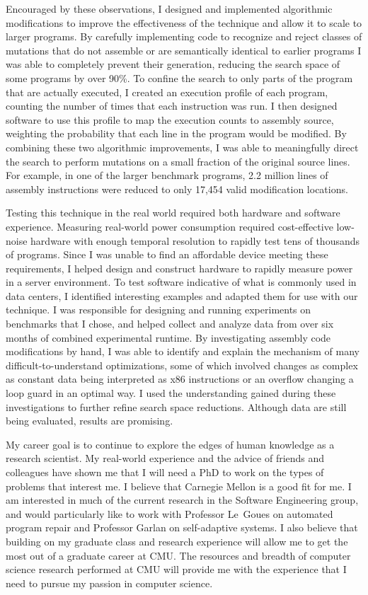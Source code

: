 \documentclass[12pt]{article}
\begin{document}
Encouraged by these observations, I designed and implemented algorithmic
modifications to improve the effectiveness of the technique and allow it to
scale to larger programs. By carefully implementing code to recognize and reject
classes of mutations that do not assemble or are semantically identical to
earlier programs I was able to completely prevent their generation, reducing the
search space of some programs by over 90\%. To confine the search to only parts
of the program that are actually executed, I created an execution profile of
each program, counting the number of times that each instruction was run. I then
designed software to use this profile to map the execution counts to assembly
source, weighting the probability that each line in the program would be
modified. By combining these two algorithmic improvements, I was able to
meaningfully direct the search to perform mutations on a small fraction of the
original source lines. For example, in one of the larger benchmark programs, 2.2
million lines of assembly instructions were reduced to only 17,454 valid
modification locations.

Testing this technique in the real world required both hardware and software
experience. Measuring real-world power consumption required cost-effective
low-noise hardware with enough temporal resolution to rapidly test tens of
thousands of programs. Since I was unable to find an affordable device meeting
these requirements, I helped design and construct hardware to rapidly measure
power in a server environment. To test software indicative of what is commonly
used in data centers, I identified interesting examples and adapted them for use
with our technique. I was responsible for designing and running experiments on
benchmarks that I chose, and helped collect and analyze data from over six
months of combined experimental runtime. By investigating assembly code
modifications by hand, I was able to identify and explain the mechanism of many
difficult-to-understand optimizations, some of which involved changes as complex
as constant data being interpreted as x86 instructions or an overflow changing a
loop guard in an optimal way. I used the understanding gained during these
investigations to further refine search space reductions. Although data are
still being evaluated, results are promising.

My career goal is to continue to explore the edges of human knowledge as a
research scientist. My real-world experience and the advice of friends and
colleagues have shown me that I will need a PhD to work on the types of problems
that interest me. I believe that Carnegie Mellon is a good fit for me. I am
interested in much of the current research in the Software Engineering group,
and would particularly like to work with Professor Le~Goues on automated program
repair and Professor Garlan on self-adaptive systems. I also believe that
building on my graduate class and research experience will allow me to get the
most out of a graduate career at CMU. The resources and breadth of computer
science research performed at CMU will provide me with the experience that I
need to pursue my passion in computer science.
\end{document}
